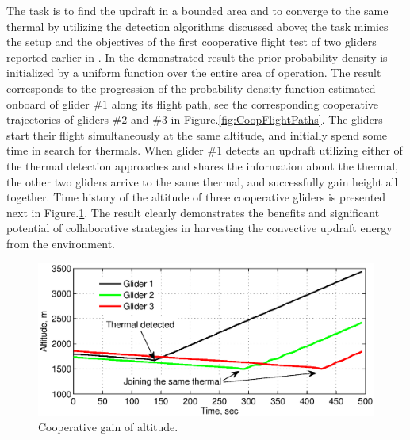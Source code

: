 \documentclass[letterpaper, 10 pt, conference]{ieeeconf}  %
\newcommand{\squeezeup}{\vspace{-1.0mm}}
\begin{document}
The task is to find the updraft in a bounded area and to converge to the same thermal by utilizing the detection algorithms discussed above; the task mimics the setup and the objectives of the first cooperative flight test of two gliders reported earlier in \cite{AKlass_JGCD:2012}. In the demonstrated
result the prior probability density is initialized by a uniform function over the entire area of operation. The result corresponds to the progression of the probability density function estimated onboard of glider $\#1$ along its flight path, see the corresponding cooperative trajectories of gliders
$\#2$ and $\#3$ in Figure.\ref{fig:CoopFlightPaths}. The gliders start their flight simultaneously at the same altitude, and initially spend some time in search for thermals. When glider $\#1$ detects an updraft utilizing either of the thermal detection approaches and shares the information about the thermal, the other two gliders arrive to the same thermal, and successfully gain height all together. Time history of the altitude of three cooperative gliders is presented next in Figure.\ref{fig:CoopFlightHeight}. The result clearly demonstrates the benefits and significant potential of collaborative strategies in harvesting the convective updraft energy from the environment.
\begin{figure}[thpb]
  \centering
  \includegraphics[scale=0.39]{Figures/Coop_gain_altitude.eps}
  \caption{Cooperative gain of altitude.}
  \label{fig:CoopFlightHeight}
\end{figure}
\squeezeup
\end{document}
